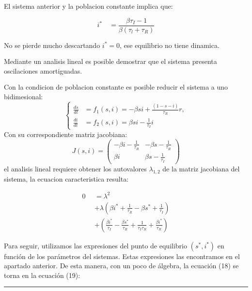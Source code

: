 \documentclass[twocolumn,aps,prl]{revtex4-1}
\newcommand*\sepline{%
  \begin{center}
    \rule[1ex]{.5\textwidth}{.5pt}
  \end{center}}
\begin{document}
El sistema anterior y la poblacion constante implica que:

$$
i^{*} \quad=\frac{\beta \tau_{I}-1}{\beta\left(\tau_{l}+\tau_{R}\right)}
$$

No se pierde mucho descartando $i^{*}=0$, ese equilibrio no tiene dinamica.


Mediante un analisis lineal es posible demostrar que el sistema presenta oscilaciones amortiguadas. 

Con la condicion de poblacion constante es posible reducir el sistema a uno bidimesional:
$$ \left\lbrace
\begin{aligned}
\frac{d s}{d t} &= f_1(s, i) = -\beta s i+\frac{(1-s-i)}{\tau_{R}} r , \\
\frac{d i}{d t} &= f_2(s, i) = \beta s i-\frac{1}{\tau_{I}} i  
\end{aligned}
\right.
$$
Con su correspondiente matriz jacobiana:
$$
J (s, i) = 
\left(
  \begin{array}{cc}
-\beta i - \frac{1}{\tau_{R}} & -\beta s - \frac{1}{\tau_{R}} \\
 \beta i                     &   \beta s - \frac{1}{\tau_{I}}
  \end{array}
\right)
$$
el analisis lineal requiere obtener los autovalores $\lambda_{1,2}$ de la matriz jacobiana del sistema, la ecuacion caracteristica resulta:

$$
\begin{aligned}
  0 & = \lambda^{2} \\
  \quad & +\lambda\left(\beta i^{*}+\frac{1}{\tau_{R}}-\beta s^{*}+\frac{1}{\tau_{I}}\right) \\
  \quad & +\left(\frac{\beta i^{*}}{\tau_{I}}-\frac{\beta s^{*}}{\tau_{R}}+\frac{1}{\tau_{I} \tau_{R}}+\frac{\beta i^{*}}{\tau_{R}}\right)
\end{aligned}
$$

Para seguir, utilizamos las expresiones del punto de equilibrio $\left(s^{*}, i^{*}\right)$ en función de los parámetros del sistemas. Estas expresiones las encontramos en el apartado anterior. De esta manera, con un poco de álgebra, la ecuación (18) se torna en la ecuación (19):

\sepline
\end{document}
